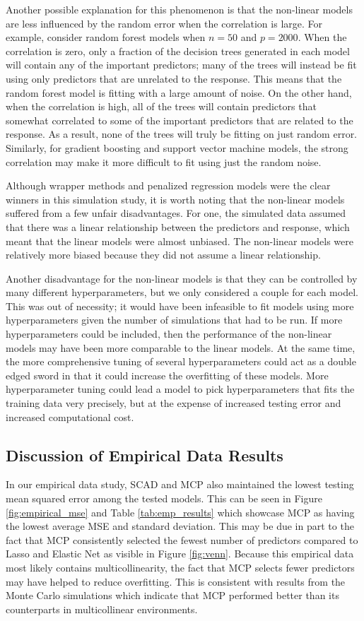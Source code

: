 \documentclass{article}
\begin{document}
Another possible explanation for this phenomenon is that the non-linear models are less influenced by the random error when the correlation is large. For example, consider random forest models when $n = 50$ and $p = 2000$. When the correlation is zero, only a fraction of the decision trees generated in each model will contain any of the important predictors; many of the trees will instead be fit using only predictors that are unrelated to the response. This means that the random forest model is fitting with a large amount of noise. On the other hand, when the correlation is high, all of the trees will contain predictors that somewhat correlated to some of the important predictors that are related to the response. As a result, none of the trees will truly be fitting on just random error. Similarly, for gradient boosting and support vector machine models, the strong correlation may make it more difficult to fit using just the random noise.

Although wrapper methods and penalized regression models were the clear winners in this simulation study, it is worth noting that the non-linear models suffered from a few unfair disadvantages. For one, the simulated data assumed that there was a linear relationship between the predictors and response, which meant that the linear models were almost unbiased. The non-linear models were relatively more biased because they did not assume a linear relationship. 

Another disadvantage for the non-linear models is that they can be controlled by many different hyperparameters, but we only considered a couple for each model. This was out of necessity; it would have been infeasible to fit models using more hyperparameters given the number of simulations that had to be run. If more hyperparameters could be included, then the performance of the non-linear models may have been more comparable to the linear models. At the same time, the more comprehensive tuning of several hyperparameters could act as a double edged sword in that it could increase the overfitting of these models. More hyperparameter tuning could lead a model to pick hyperparameters that fits the training data very precisely, but at the expense of increased testing error and increased computational cost.

\subsection{Discussion of Empirical Data Results}
In our empirical data study, SCAD and MCP also maintained the lowest testing mean squared error among the tested models. This can be seen in Figure \ref{fig:empirical_mse} and Table \ref{tab:emp_results} which showcase MCP as having the lowest average MSE and standard deviation. This may be due in part to the fact that MCP consistently selected the fewest number of predictors compared to Lasso and Elastic Net as visible in Figure \ref{fig:venn}. Because this empirical data most likely contains multicollinearity, the fact that MCP selects fewer predictors may have helped to reduce overfitting. This is consistent with results from the Monte Carlo simulations which indicate that MCP performed better than its counterparts in multicollinear environments.
\end{document}
